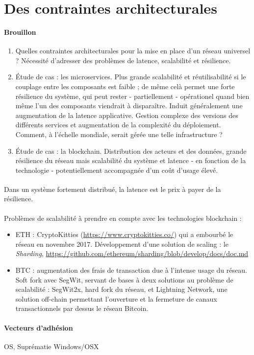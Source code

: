 \section{Des contraintes architecturales}

\paragraph{Brouillon}

\begin{enumerate}
    \item Quelles contraintes architecturales pour la mise en place d'un réseau universel ?
    Nécessité d'adresser des problèmes de latence, scalabilité et résilience.
    \item Étude de cas : les microservices. Plus grande scalabilité et réutilisabilité si le couplage entre les composants
    est faible ; de même celà permet une forte résilience du système, qui peut rester - partiellement - opérationel quand
    bien même l'un des composants viendrait à disparaître. Induit généralement une augmentation de la latence applicative.
    Gestion complexe des versions des différents services et augmentation de la complexité du déploiement. Comment, à l'échelle
    mondiale, serait gérée une telle infrastructure ?
    \item Étude de cas : la blockchain. Distribution des acteurs et des données, grande résilience du réseau mais scalabilité
    du système et latence - en fonction de la technologie - potentiellement accompagnée d'un coût d'usage élevé.
\end{enumerate}

\paragraph{} Dans un système fortement distribué, la latence est le prix à payer de la résilience.

\paragraph{} Problèmes de scalabilité à prendre en compte avec les technologies blockchain :

\begin{itemize}
    \item ETH : CryptoKitties (\url{https://www.cryptokitties.co/}) qui a embourbé le réseau en novembre 2017. 
    Développement d'une solution de scaling : le \emph{Sharding}, \url{https://github.com/ethereum/sharding/blob/develop/docs/doc.md}
    \item BTC : augmentation des frais de transaction due à l'intense usage du réseau.
    Soft fork avec SegWit, servant de bases à deux solutions au problème de scalabilité : SegWit2x, hard fork du réseau,
    et Lightning Network, une solution off-chain permettant l'ouverture et la fermeture de canaux transactionnels par dessus
    le réseau Bitcoin.
\end{itemize}

\paragraph{Vecteurs d'adhésion} OS, Suprématie Windows/OSX